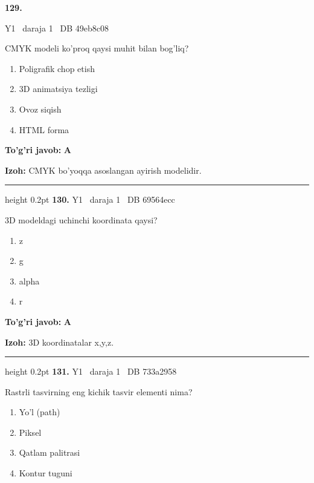 \documentclass[10pt,a4paper,oneside]{article}
\begin{document}
\hypertarget{q129}{\textbf{\color{ink}129.}}  {\color{muted}\scriptsize Y1 \textbullet\ daraja 1 \textbullet\ DB 49eb8c08}
\par
CMYK modeli ko'proq qaysi muhit bilan bog'liq?
\begin{enumerate}[label=\Alph*),leftmargin=9mm]
\item Poligrafik chop etish
\item 3D animatsiya tezligi
\item Ovoz siqish
\item HTML forma
\end{enumerate}
\begin{tcolorbox}[enhanced,breakable,colback=teal!4,colframe=teal!45!black,boxrule=0.45pt,arc=1.2mm,left=2.8mm,right=2.8mm,top=2mm,bottom=2mm,before skip=2mm,after skip=2mm]
\textbf{\color{teal}To'g'ri javob:} \textbf{A}
\par\smallskip
\textbf{Izoh:} CMYK bo'yoqqa asoslangan ayirish modelidir.
\end{tcolorbox}
\vspace{2mm}\hrule height 0.2pt \vspace{4mm}
\hypertarget{q130}{\textbf{\color{ink}130.}}  {\color{muted}\scriptsize Y1 \textbullet\ daraja 1 \textbullet\ DB 69564ecc}
\par
3D modeldagi uchinchi koordinata qaysi?
\begin{enumerate}[label=\Alph*),leftmargin=9mm]
\item z
\item g
\item alpha
\item r
\end{enumerate}
\begin{tcolorbox}[enhanced,breakable,colback=teal!4,colframe=teal!45!black,boxrule=0.45pt,arc=1.2mm,left=2.8mm,right=2.8mm,top=2mm,bottom=2mm,before skip=2mm,after skip=2mm]
\textbf{\color{teal}To'g'ri javob:} \textbf{A}
\par\smallskip
\textbf{Izoh:} 3D koordinatalar x,y,z.
\end{tcolorbox}
\vspace{2mm}\hrule height 0.2pt \vspace{4mm}
\hypertarget{q131}{\textbf{\color{ink}131.}}  {\color{muted}\scriptsize Y1 \textbullet\ daraja 1 \textbullet\ DB 733a2958}
\par
Rastrli tasvirning eng kichik tasvir elementi nima?
\begin{enumerate}[label=\Alph*),leftmargin=9mm]
\item Yo'l (path)
\item Piksel
\item Qatlam palitrasi
\item Kontur tuguni
\end{enumerate}
\end{document}
